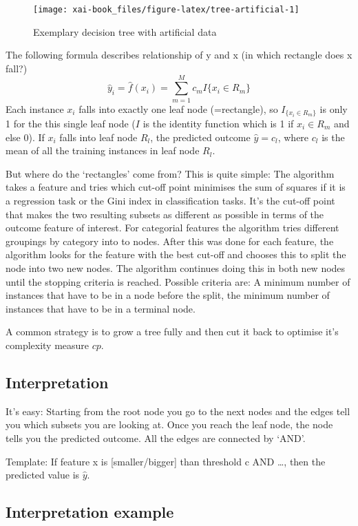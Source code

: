 \documentclass[12pt,]{krantz}
\theoremstyle{definition}
\theoremstyle{definition}
\theoremstyle{definition}
\theoremstyle{remark}
\begin{document}
\begin{figure}
\texttt{[image: xai-book\_files/figure-latex/tree-artificial-1]} \caption{Exemplary decision tree with artificial data}\label{fig:tree-artificial}
\end{figure}

The following formula describes relationship of y and x (in which
rectangle does x fall?)
\[\hat{y}_i = \hat{f}(x_i) = \sum_{m = 1}^M c_m I\{x_i \in R_m\}\] Each
instance \(x_i\) falls into exactly one leaf node (=rectangle), so
\(I_{\{x_i \in R_m\}}\) is only 1 for the this single leaf node (\(I\)
is the identity function which is 1 if \(x_i \in R_m\) and else 0). If
\(x_i\) falls into leaf node \(R_l\), the predicted outcome
\(\hat{y} = c_l\), where \(c_l\) is the mean of all the training
instances in leaf node \(R_l\).

But where do the `rectangles' come from? This is quite simple: The
algorithm takes a feature and tries which cut-off point minimises the
sum of squares if it is a regression task or the Gini index in
classification tasks. It's the cut-off point that makes the two
resulting subsets as different as possible in terms of the outcome
feature of interest. For categorial features the algorithm tries
different groupings by category into to nodes. After this was done for
each feature, the algorithm looks for the feature with the best cut-off
and chooses this to split the node into two new nodes. The algorithm
continues doing this in both new nodes until the stopping criteria is
reached. Possible criteria are: A minimum number of instances that have
to be in a node before the split, the minimum number of instances that
have to be in a terminal node.

A common strategy is to grow a tree fully and then cut it back to
optimise it's complexity measure \(cp\).

\subsection{Interpretation}\label{interpretation-2}

It's easy: Starting from the root node you go to the next nodes and the
edges tell you which subsets you are looking at. Once you reach the leaf
node, the node tells you the predicted outcome. All the edges are
connected by `AND'.

Template: If feature x is {[}smaller/bigger{]} than threshold c AND
\ldots{}, then the predicted value is \(\hat{y}\).

\subsection{Interpretation example}\label{interpretation-example-1}
\end{document}
